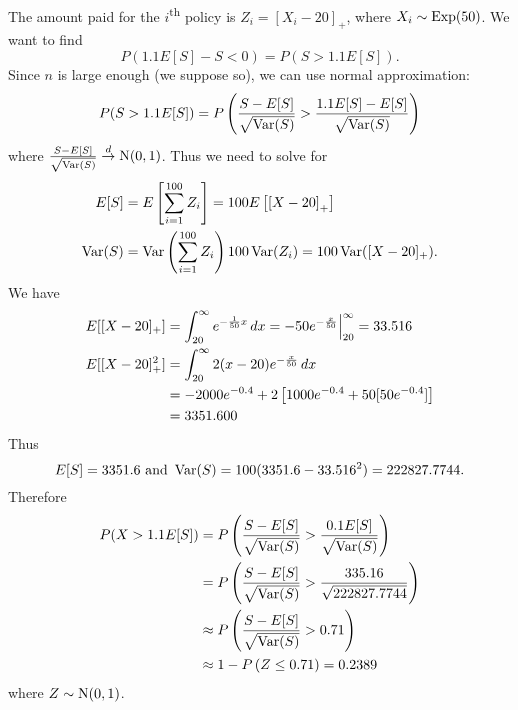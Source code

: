 \documentclass[notoc,notitlepage]{tufte-book}
\begin{document}
\begin{solution}
  The amount paid for the $i$\textsuperscript{th} policy is $Z_i = [ X_i - 20 ]_+$, where $X_i \sim \operatorname{Exp}(50)$. We want to find
  \begin{equation*}
    P( 1.1 E[S] - S < 0 ) = P ( S > 1.1 E[S] ).
  \end{equation*}
  Since $n$ is large enough (we suppose so), we can use normal approximation:
  \begin{equation*}
    P( S > 1.1 E[S] ) = P \left( \frac{S - E[S]}{\sqrt{ \operatorname{Var}(S) }} > \frac{1.1 E[S] - E[S]}{\sqrt{\operatorname{Var}(S)}} \right)
  \end{equation*}
  where $\frac{S - E[S]}{\sqrt{\operatorname{Var}(S)}} \overset{d}{\to} \operatorname{N}(0, 1)$. Thus we need to solve for
  \begin{align*}
    E[S] &= E \left[ \sum_{i=1}^{100} Z_i \right] = 100 E \left[ \left[ X - 20 \right]_+ \right] \\
    \operatorname{Var}(S) &= \operatorname{Var} \left( \sum_{i=1}^{100} Z_i \right) 100 \operatorname{Var}(Z_i) = 100 \operatorname{Var}( [ X - 20 ]_+ ).
  \end{align*}
  We have
  \begin{align*}
    E [ [ X - 20 ]_+ ] &= \int_{20}^{\infty} e^{-\frac{1}{50}x} \mathop{}\!d{x} = -50e^{-\frac{x}{50}} \Big|_{20}^{\infty} = 33.516 \\
    E [ [ X - 20 ]_+^2 ] &= \int_{20}^{\infty} 2(x - 20)e^{-\frac{x}{50}} \mathop{}\!d{x} \\
                         &= -2000e^{-0.4} + 2 \left[ 1000e^{-0.4} + 50 [ 50e^{-0.4} ] \right] \\
                         &= 3351.600
  \end{align*}
  Thus
  \begin{equation*}
    E[S] = 3351.6 \text{ and } \operatorname{Var}(S) = 100 ( 3351.6 - 33.516^2 ) = 222827.7744.
  \end{equation*}
  Therefore
  \begin{align*}
    P(X > 1.1E[S]) &= P \left( \frac{S - E[S]}{\sqrt{\operatorname{Var}(S)}} > \frac{0.1 E[S]}{\sqrt{\operatorname{Var}(S)}} \right) \\
                   &= P \left( \frac{S - E[S]}{\sqrt{\operatorname{Var}(S)}} > \frac{335.16}{\sqrt{ 222827.7744 }} \right) \\
                   &\approx P \left( \frac{S - E[S]}{\sqrt{\operatorname{Var}(S)}} > 0.71 \right) \\
                   &\approx 1 - P \left( Z \leq 0.71 \right) = 0.2389
  \end{align*}
  where $Z \sim \operatorname{N}(0, 1)$.
\end{solution}
\end{document}
